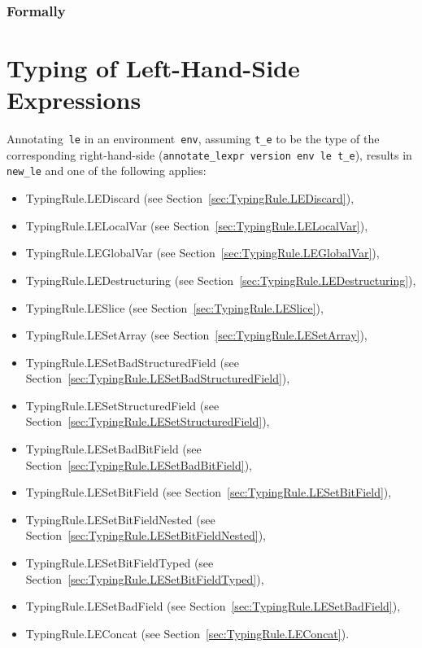 \documentclass{book}
\begin{document}
\begin{emptyformal}
  \subsection{Formally}
\end{emptyformal}


\chapter{Typing of Left-Hand-Side Expressions}

Annotating~\texttt{le} in an environment~\texttt{env}, assuming \texttt{t\_e}
to be the type of the corresponding right-hand-side (\texttt{annotate\_lexpr
version env le t\_e}), results in \texttt{new\_le} and one of the following
applies:
\begin{itemize}
\item TypingRule.LEDiscard (see Section~\ref{sec:TypingRule.LEDiscard}),
\item TypingRule.LELocalVar (see Section~\ref{sec:TypingRule.LELocalVar}),
\item TypingRule.LEGlobalVar (see Section~\ref{sec:TypingRule.LEGlobalVar}),
\item TypingRule.LEDestructuring (see Section~\ref{sec:TypingRule.LEDestructuring}),
\item TypingRule.LESlice (see Section~\ref{sec:TypingRule.LESlice}),
\item TypingRule.LESetArray (see Section~\ref{sec:TypingRule.LESetArray}),
\item TypingRule.LESetBadStructuredField (see Section~\ref{sec:TypingRule.LESetBadStructuredField}),
\item TypingRule.LESetStructuredField (see Section~\ref{sec:TypingRule.LESetStructuredField}),
\item TypingRule.LESetBadBitField (see Section~\ref{sec:TypingRule.LESetBadBitField}),
\item TypingRule.LESetBitField (see Section~\ref{sec:TypingRule.LESetBitField}),
\item TypingRule.LESetBitFieldNested (see Section~\ref{sec:TypingRule.LESetBitFieldNested}),
\item TypingRule.LESetBitFieldTyped (see Section~\ref{sec:TypingRule.LESetBitFieldTyped}),
\item TypingRule.LESetBadField (see Section~\ref{sec:TypingRule.LESetBadField}),
\item TypingRule.LEConcat (see Section~\ref{sec:TypingRule.LEConcat}).
\end{itemize}
\end{document}
